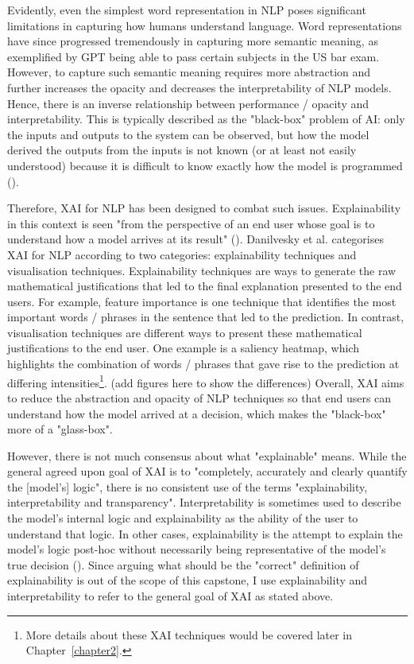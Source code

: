 Evidently, even the simplest word representation in NLP poses significant limitations in capturing how humans understand language. Word representations have since progressed tremendously in capturing more semantic meaning, as exemplified by GPT being able to pass certain subjects in the US bar exam. However, to capture such semantic meaning requires more abstraction and further increases the opacity and decreases the interpretability of NLP models. Hence, there is an inverse relationship between performance / opacity and interpretability.  This is typically described as the "black-box" problem of AI: only the inputs and outputs to the system can be observed, but how the model derived the outputs from the inputs is not known (or at least not easily understood) because it is difficult to know exactly how the model is programmed (\cite{zednik2021}).

Therefore, XAI for NLP has been designed to combat such issues. Explainability in this context is seen "from the perspective of an end user whose goal is to understand how a model arrives at its result" (\cite{danilevsky2020}). Danilvesky et al. categorises XAI for NLP according to two categories: explainability techniques and visualisation techniques. Explainability techniques are ways to generate the raw mathematical justifications that led to the final explanation presented to the end users. For example, feature importance is one technique that identifies the most important words / phrases in the sentence that led to the prediction. In contrast, visualisation techniques are different ways to present these mathematical justifications to the end user. One example is a saliency heatmap, which highlights the combination of words / phrases that gave rise to the prediction at differing intensities\footnote{More details about these XAI techniques would be covered later in Chapter~\ref{chapter2}.}. (add figures here to show the differences) Overall, XAI aims to reduce the abstraction and opacity of NLP techniques so that end users can understand how the model arrived at a decision, which makes the "black-box" more of a "glass-box".

However, there is not much consensus about what "explainable" means. While the general agreed upon goal of XAI is to "completely, accurately and clearly quantify the [model's] logic", there is no consistent use of the terms "explainability, interpretability and transparency". Interpretability is sometimes used to describe the model's internal logic and explainability as the ability of the user to understand that logic. In other cases, explainability is the attempt to explain the model's logic post-hoc without necessarily being representative of the model's true decision (\cite{rosenfeld2021}). Since arguing what should be the "correct" definition of explainability is out of the scope of this capstone, I use explainability and interpretability to refer to the general goal of XAI as stated above.

